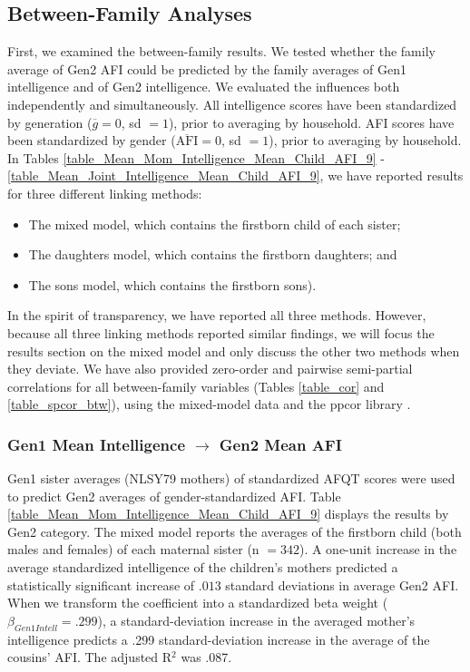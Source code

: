 \documentclass[a4paper,man,apacite,natbib,12pt,longtable]{apa6}\usepackage[]{graphicx}\usepackage[]{color}
\begin{document}
\subsection{Between-Family Analyses}
First, we examined the between-family results. We tested whether the family average of Gen2 AFI could be predicted by the family averages of Gen1 intelligence and of Gen2 intelligence. We evaluated the influences both independently and simultaneously. All intelligence scores have been standardized by generation ($\overline{g} = 0$, sd $= 1$), prior to averaging by household. AFI scores have been standardized by gender ($\overline{\mathrm{AFI}} = 0$, sd $= 1$), prior to averaging by household. In Tables \ref{table_Mean_Mom_Intelligence_Mean_Child_AFI_9} - \ref{table_Mean_Joint_Intelligence_Mean_Child_AFI_9}, we have reported results for three different linking methods:
\begin{itemize} 
\item The mixed model, which contains the firstborn child of each sister;
\item The daughters model, which contains the firstborn daughters; and 
\item The sons model, which contains the firstborn sons).\end{itemize}
In the spirit of transparency, we have reported all three methods. However, because all three linking methods reported similar findings, we will focus the results section on the mixed model and only discuss the other two methods when they deviate. We have also provided zero-order and pairwise semi-partial correlations for all between-family variables (Tables \ref{table_cor} and \ref{table_spcor_btw}), using the mixed-model data and the ppcor \R library \citep{kim2015ppcor}.

\subsubsection{Gen1 Mean Intelligence $\rightarrow$ Gen2 Mean AFI} Gen1 sister averages (NLSY79 mothers) of standardized AFQT scores were used to predict Gen2 averages of gender-standardized AFI. Table \ref{table_Mean_Mom_Intelligence_Mean_Child_AFI_9} displays the results by Gen2 category. The mixed model reports the averages of the firstborn child (both males and females) of each maternal sister (n $= 342$). A one-unit increase in the average standardized intelligence of the children's mothers predicted a statistically significant increase of $.013$ standard deviations in average Gen2 AFI. When we transform the coefficient into a standardized beta weight ($\beta_{Gen1 Intell} = .299$), a standard-deviation increase in the averaged mother's intelligence predicts a .299 standard-deviation increase in the average of the cousins' AFI. The adjusted R$^{2}$ was .087.
\end{document}
